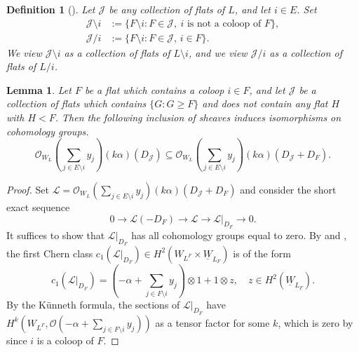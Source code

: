 \documentclass{amsart}
\newtheorem{definition}[theorem]{Definition}
\newtheorem{lemma}[theorem]{Lemma}
\theoremstyle{definition}
\begin{document}
\begin{definition}[{\cite[Definition 3.13]{LenzHierarchical}}]
    Let $\mathcal{J}$ be any collection of flats of $L$, and let 
    $i \in E$. Set
    \begin{align*}
        \mathcal{J}\setminus i &:= \{F\setminus i : F \in 
        \mathcal{J},\ \text{$i$ is not a coloop of $F$}\},   \\
            \mathcal{J}/i &:= \{F\setminus i 
            :  F \in \mathcal{J}, \, i \in F\}.
    \end{align*}
    We view $\mathcal{J}\setminus i$ as a collection of flats of 
    $L\setminus i$, and we view $\mathcal{J}/i$ as a collection of flats of 
    $L/i$.
\end{definition}

\begin{lemma}\label{coloop-flats}
Let $F$ be a flat which contains a coloop $i \in F$, and let $\mathcal{J}$ be a collection of flats which contains $\{G : G \ge F\}$ and does not contain any flat $H$ with $H < F$. Then the 
    following inclusion of sheaves induces isomorphisms on cohomology groups.
    \[
        \mathcal{O}_{W_L}(\sum_{j \in E\setminus i} y_j)(k\alpha)(D_{\mathcal{J}}) 
        \subseteq \mathcal{O}_{W_L}(\sum_{j \in E\setminus i} 
        y_j)(k\alpha)(D_{\mathcal{J}} + D_F).
    \]
\end{lemma}
\begin{proof}
    Set $\mathcal{L} = \mathcal{O}_{W_L}(\sum_{j \in E \setminus i} 
y_j)(k\alpha)(D_{\mathcal{J}}+D_F)$ and consider the short exact sequence
    \[
        0 \to \mathcal{L}(-D_F) \to \mathcal{L} \to \mathcal{L} 
        \vert_{D_F} \to 0. 
    \]
    It suffices to show that $\mathcal{L} \vert_{D_F}$ has all 
    cohomology groups equal to zero. 
    By  and , the first Chern class $c_1(\mathcal{L} \vert_{D_F}) \in 
    H^2(W_{L^F} \times \underline{W}_{L_F})$ is of the form 
    \[
        c_1(\mathcal{L} \vert_{D_F}) = (-\alpha + \sum_{j \in F 
                \setminus i} y_j) \otimes 1 + 1 \otimes z,\quad z \in 
        H^2(\underline{W}_{L_F}).
    \]
    By the K\"unneth formula, the sections of $\mathcal{L} \vert_{D_F}$ have 
    $H^k(W_{L^F}, \mathcal{O}(-\alpha + \sum_{j \in F \setminus i} 
    y_j))$ as a tensor 
factor for some $k$, which is zero by  since $i$ is a 
coloop of $F$.
\end{proof}
\end{document}
